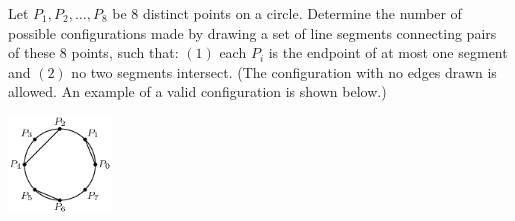 Let $ P_1,P_2,\ldots,P_8$ be $ 8$ distinct points on a circle. Determine the number of possible configurations made by drawing a set of line segments connecting pairs of these $ 8$ points, such that: $ (1)$ each $ P_i$ is the endpoint of at most one segment and $ (2)$ no two segments intersect. (The configuration with no edges drawn is allowed. An example of a valid configuration is shown below.)


\begin{center}
\includegraphics[width = 27.6mm]{img/fig0.png}
\end{center}